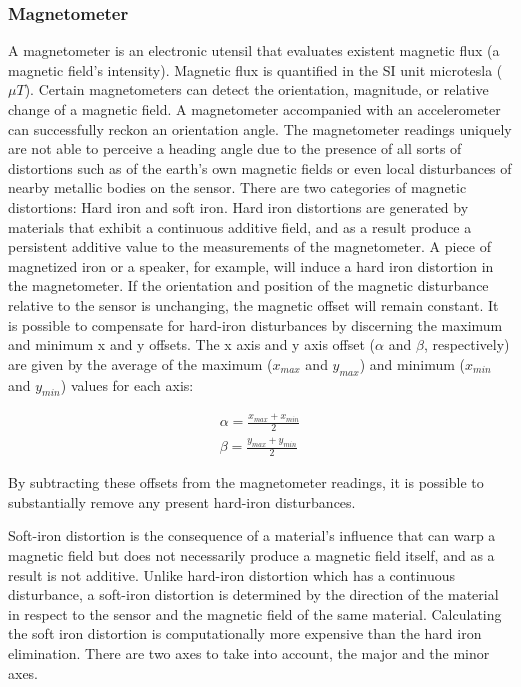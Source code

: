 \subsubsection{Magnetometer}
A magnetometer is an electronic utensil that evaluates existent magnetic flux (a magnetic field’s intensity). Magnetic flux is quantified in the SI unit microtesla ($\mu T$). Certain magnetometers can detect the orientation, magnitude, or relative change of a magnetic field. A magnetometer accompanied with an accelerometer can successfully reckon an orientation angle. The magnetometer readings uniquely are not able to perceive a heading angle due to the presence of all sorts of distortions such as of the earth's own magnetic fields or even local disturbances of nearby metallic bodies on the sensor. There are two categories of magnetic distortions: Hard iron and soft iron. Hard iron distortions are generated by materials that exhibit a continuous additive field, and as a result produce a persistent additive value to the measurements of the magnetometer. A piece of magnetized iron or a speaker, for example, will induce a hard iron distortion in the magnetometer. If the orientation and position of the magnetic disturbance relative to the sensor is unchanging, the magnetic offset will remain constant. It is possible to compensate for hard-iron disturbances by discerning the maximum and minimum x and y offsets. The x axis and y axis offset ($\alpha$ and $\beta$, respectively) are given by the average of the maximum ($x_{max}$ and $y_{max}$) and minimum ($x_{min}$ and $y_{min}$) values for each axis:

\begin{equation}
    \begin{gathered}
        \alpha = \frac{x_{max}+x_{min}}{2}\\
        \beta = \frac{y_{max}+y_{min}}{2}
    \end{gathered}
\end{equation}

By subtracting these offsets from the magnetometer readings, it is possible to substantially remove any present hard-iron disturbances.

Soft-iron distortion is the consequence of a material’s influence that can warp a magnetic field but does not necessarily produce a magnetic field itself, and as a result is not additive. Unlike hard-iron distortion which has a continuous disturbance, a soft-iron distortion is determined by the direction of the material in respect to the sensor and the magnetic field of the same material. Calculating the soft iron distortion is computationally more expensive than the hard iron elimination. There are two axes to take into account, the major and the minor axes.

